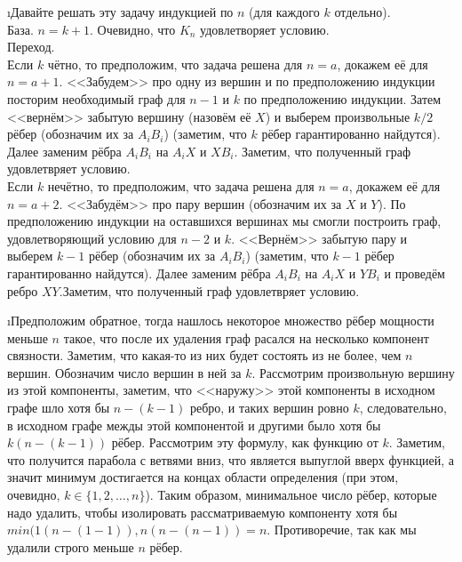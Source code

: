 \i Давайте решать эту задачу индукцией по $n$ (для каждого $k$ отдельно).\\
База. $n = k + 1$. Очевидно, что $K_n$ удовлетворяет условию.\\
Переход.\\
Если $k$ чётно, то предположим, что задача решена для $n = a$, докажем её для $n = a + 1$.  <<Забудем>> про одну из вершин и по предположению индукции посторим необходимый граф для $n - 1$ и $k$ по предположению индукции. Затем <<вернём>> забытую вершину (назовём её $X$) и выберем произвольные $k/2$ рёбер (обозначим их за $A_iB_i$) (заметим, что $k$ рёбер гарантированно найдутся). Далее заменим рёбра $A_iB_i$ на $A_iX$ и $XB_i$. Заметим, что полученный граф удовлетвряет условию.\\
Если $k$ нечётно, то предположим, что задача решена для $n = a$, докажем её для $n = a + 2$. <<Забудём>> про пару вершин (обозначим их за $X$ и $Y$). По предположению индукции на оставшихся вершинах мы смогли построить граф, удовлетворяющий условию для $n - 2$ и $k$. <<Вернём>> забытую пару и выберем $k-1$ рёбер (обозначим их за $A_iB_i$) (заметим, что $k-1$ рёбер гарантированно найдутся). Далее заменим рёбра $A_iB_i$ на $A_iX$ и $YB_i$ и проведём ребро $XY$.Заметим, что полученный граф удовлетвряет условию.

\i Предположим обратное, тогда нашлось некоторое множество рёбер мощности меньше $n$ такое, что после их удаления граф расался на несколько компонент связности. Заметим, что какая-то из них будет состоять из не более, чем $n$ вершин. Обозначим число вершин в ней за $k$. Рассмотрим произвольную вершину из этой компоненты, заметим, что <<наружу>> этой компоненты в исходном графе шло хотя бы $n - (k-1)$ ребро, и таких вершин ровно $k$, следовательно, в исходном графе межды этой компонентой и другими было хотя бы $k(n - (k-1))$ рёбер. Рассмотрим эту формулу, как функцию от $k$. Заметим, что получится парабола с ветвями вниз, что является выпуглой вверх функцией, а значит минимум достигается на концах области определения (при этом, очевидно, $k \in \{1, 2, \ldots, n\}$). Таким образом, минимальное число рёбер, которые надо удалить, чтобы изолировать рассматриваемую компоненту хотя бы $min(1(n - (1-1)), n(n - (n-1)) = n$. Противоречие, так как мы удалили строго меньше $n$ рёбер.


